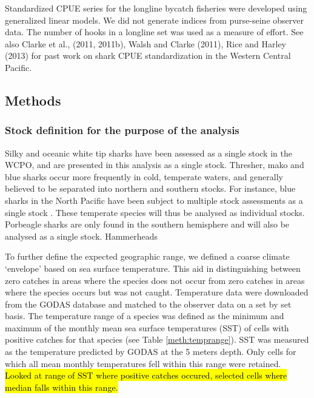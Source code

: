 Standardized CPUE series for the longline bycatch fisheries were developed using generalized linear models. We did not generate indices from purse-seine observer data. The number of hooks in a longline set was used as a measure of effort.
See also Clarke et al., (2011, 2011b),  Walsh and Clarke (2011), Rice and Harley (2013) for past work on shark CPUE standardization in the Western Central Pacific.
\subsection{Methods}
\label{cpuemeth:datafilter}
\subsubsection{Stock definition for the purpose of the analysis}

Silky and oceanic white tip sharks have been assessed \citep{Rice2012_a, Rice2013_a} as a single stock in the WCPO, and are presented in this analysis as a single stock.  Thresher, mako and blue sharks occur more frequently in cold, temperate waters, and generally believed to be separated into northern and southern stocks. For instance, blue sharks in the North Pacific have been subject to multiple stock assessments as a single stock \citep{XXXX}. These temperate species will thus be analysed as individual stocks. Porbeagle sharks are only found in the southern hemisphere and will also be analysed as a single stock. Hammerheads 

To further define the expected geographic range, we defined a coarse climate `envelope' based on sea surface temperature. This aid in distinguishing between zero catches in areas where the species does not occur from zero catches in areas where the species occurs but was not caught. Temperature data were downloaded from the GODAS database \citep{GODASXXXX_a} and matched to the observer data on a set by set basis. The temperature range of a species was defined as the minimum and maximum of the monthly mean sea surface temperatures (SST) of cells with positive catches for that species (see Table \ref{meth:temprange}). SST was measured as the temperature predicted by GODAS at the 5 meters depth. Only cells for which all mean monthly temperatures fell within this range were retained. %
\hl{Looked at range of SST where positive catches occured, selected cells where median falls within this range.}
